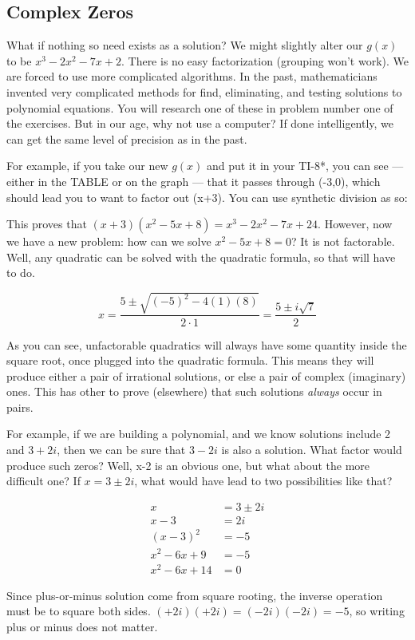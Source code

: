 \subsection{Complex Zeros}
What if nothing so need exists as a solution?  We might slightly alter our $g(x)$ to be
$x^3-2x^2-7x+2$.  There is no easy factorization (grouping won't work).  We are forced
to use more complicated algorithms.  In the past, mathematicians invented very complicated
methods for find, eliminating, and testing solutions to polynomial equations.  You will research
one of these in problem number one of the exercises.  But in our age, why not use a computer?
If done intelligently, we can get the same level of precision as in the past.

For example, if you take our new $g(x)$ and put it in your TI-8*, you can see --- either in the
TABLE or on the graph --- that it passes through (-3,0), which should lead you to want to
factor out (x+3).  You can use synthetic division as so:



This proves that $(x+3)(x^2-5x+8)=x^3-2x^2-7x+24$.  However, now we have a new problem: how
can we solve $x^2-5x+8=0$?  It is not factorable.  Well, any quadratic can be solved with
the quadratic formula, so that will have to do.

$$
x=\frac{5\pm\sqrt{(-5)^2-4(1)(8)}}{2\cdot{}1}
=\frac{5\pm i\sqrt{7}}{2}
$$

As you can see, unfactorable quadratics will always have some quantity inside the square root,
once plugged into the quadratic formula.  This means they will produce either a pair of
irrational solutions, or else a pair of complex (imaginary) ones.  This has other to prove
(elsewhere) that such solutions \emph{always} occur in pairs.

For example, if we are building a polynomial, and we know solutions include 2 and $3+2i$,
then we can be sure that $3-2i$ is also a solution.  What factor would produce such zeros?
Well, x-2 is an obvious one, but what about the more difficult one?  If $x=3 \pm 2i$, what
would have lead to two possibilities like that?

\begin{align*}
  x & = 3 \pm 2i\\
  x - 3 & =  2i \\
  (x-3)^2 & = -5\\
  x^2-6x+9 &= -5\\
  x^2-6x+14 &= 0
\end{align*}

Since plus-or-minus solution come from square rooting, the inverse operation must be to
square both sides.  $(+2i)(+2i) = (-2i)(-2i) = -5$, so writing plus or minus does not matter.
